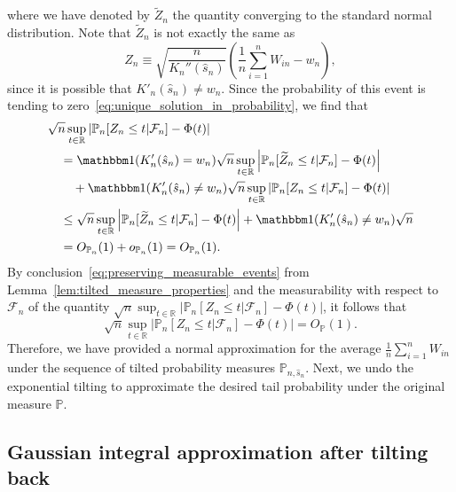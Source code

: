 \documentclass[12pt]{article}
\theoremstyle{definition}
\def\P{\mathbb{P}}
\def\P{\mathbb{P}}
\renewcommand{\P}{\mathbb{P}}							%
\newcommand{\indicator}{\mathbbm 1}						%
\begin{document}
where we have denoted by $\widetilde Z_n$ the quantity converging to the standard normal distribution. Note that $\widetilde Z_n$ is not exactly the same as 
\begin{equation}
Z_n\equiv \sqrt{\frac{n}{K_n''(\hat s_n)}}\left(\frac{1}{n}\sum_{i=1}^n W_{in}-w_n\right),
\label{eq:Z_n}
\end{equation}
since it is possible that $K'_n(\hat s_n) \neq w_n$. Since the probability of this event is tending to zero~\eqref{eq:unique_solution_in_probability}, we find that
\begin{equation*}
\begin{split}
&\sqrt{n}\sup_{t\in\mathbb{R}}\left|\P_{n}[Z_n\leq t|\mathcal{F}_n]-\Phi(t)\right| \\
&\quad= \indicator(K'_n(\hat s_n) = w_n)\sqrt{n}\sup_{t\in\mathbb{R}}\left|\P_{n}[\widetilde Z_n\leq t|\mathcal{F}_n]-\Phi(t)\right| \\
&\quad \quad + \indicator(K'_n(\hat s_n) \neq w_n)\sqrt{n}\sup_{t\in\mathbb{R}}\left|\P_{n}[Z_n\leq t|\mathcal{F}_n]-\Phi(t)\right| \\
&\quad \leq \sqrt{n}\sup_{t\in\mathbb{R}}\left|\P_{n}[\widetilde Z_n\leq t|\mathcal{F}_n]-\Phi(t)\right| + \indicator(K'_n(\hat s_n) \neq w_n)\sqrt{n} \\
&\quad = O_{\P_n}(1) + o_{\P_n}(1) = O_{\P_n}(1).
\end{split}
\end{equation*}
By conclusion~\eqref{eq:preserving_measurable_events} from Lemma~\ref{lem:tilted_measure_properties} and the measurability with respect to $\mathcal F_n$ of the quantity $\sqrt{n}\sup_{t\in\mathbb{R}}\left|\P_{n}[Z_n\leq t|\mathcal{F}_n]-\Phi(t)\right|$, it follows that
\begin{equation}
\sqrt{n}\sup_{t\in\mathbb{R}}\left|\P_{n}[Z_n\leq t|\mathcal{F}_n]-\Phi(t)\right| = O_{\P}(1).
\label{eq:Z_n_convergence}
\end{equation}
Therefore, we have provided a normal approximation for the average $\frac1n \sum_{i = 1}^n W_{in}$ under the sequence of tilted probability measures $\P_{n, \hat s_n}$. Next, we undo the exponential tilting to approximate the desired tail probability under the original measure $\P$. 

\subsection{Gaussian integral approximation after tilting back}\label{sec:reduction_to_Gaussian_integral}
\end{document}
